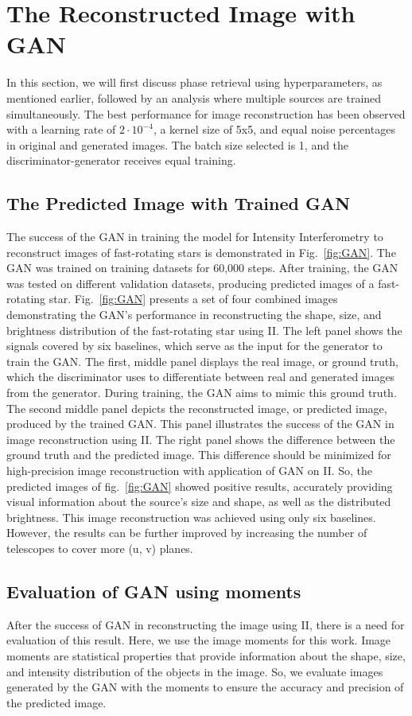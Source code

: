 \section{The Reconstructed Image with GAN}
In this section, we will first discuss phase retrieval using hyperparameters, as mentioned earlier, followed by an analysis where multiple sources are trained simultaneously. The best performance for image reconstruction has been observed with a learning rate of $2 \cdot 10^{-4}$, a kernel size of 5x5, and equal noise percentages in original and generated images. The batch size selected is 1, and the discriminator-generator receives equal training.
\subsection{The Predicted Image with Trained GAN}
The success of the GAN in training the model for Intensity Interferometry to reconstruct images of fast-rotating stars is demonstrated in Fig.~\ref{fig:GAN}. The GAN was trained on training datasets for 60,000 steps. After training, the GAN was tested on different validation datasets, producing predicted images of a fast-rotating star. Fig.~\ref{fig:GAN} presents a set of four combined images demonstrating the GAN's performance in reconstructing the shape, size, and brightness distribution of the fast-rotating star using II. The left panel shows the signals covered by six baselines, which serve as the input for the generator to train the GAN. The first, middle panel displays the real image, or ground truth, which the discriminator uses to differentiate between real and generated images from the generator. During training, the GAN aims to mimic this ground truth. The second middle panel depicts the reconstructed image, or predicted image, produced by the trained GAN. This panel illustrates the success of the GAN in image reconstruction using II. The right panel shows the difference between the ground truth and the predicted image. This difference should be minimized for high-precision image reconstruction with application of GAN on II. So, the predicted images of fig.~\ref{fig:GAN} showed positive results, accurately providing visual information about the source's size and shape, as well as the distributed brightness. This image reconstruction was achieved using only six baselines. However, the results can be further improved by increasing the number of telescopes to cover more (u, v) planes.
\subsection{Evaluation of GAN using moments}
After the success of GAN in reconstructing the image using II, there is a need for evaluation of this result. Here, we use the image moments for this work. Image moments are statistical properties that provide information about the shape, size, and intensity distribution of the objects in the image. So, we evaluate images generated by the GAN with the moments to ensure the accuracy and precision of the predicted image. 


